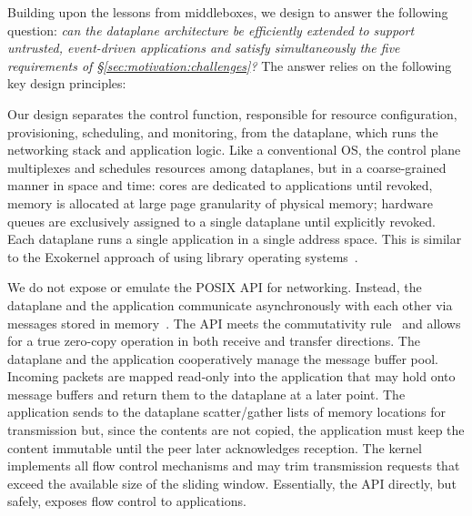 
Building upon the lessons from middleboxes, we design \ix to answer
the following question: {\it {} can the dataplane architecture be
  efficiently extended to support untrusted, event-driven applications
  and satisfy simultaneously the five requirements of
  \S\ref{sec:motivation:challenges}?}  The answer relies on the
following key design principles:


Our design separates the control function, responsible for resource
configuration, provisioning, scheduling, and monitoring, from the
dataplane, which runs the networking stack and application logic.
Like a conventional OS, the control plane multiplexes and schedules
resources among dataplanes, but in a coarse-grained manner in space and
time: cores are dedicated to applications until revoked, memory is
allocated at large page granularity of physical memory; hardware queues are
exclusively assigned to a single dataplane until explicitly revoked.
Each dataplane runs a single application in a single address space.
This is similar to the Exokernel approach of using library operating
systems~\cite{DBLP:conf/sosp/EnglerKO95}.

 We do
not expose or emulate the POSIX API for networking.  Instead, the
dataplane and the application communicate asynchronously with each
other via messages stored in
memory~\cite{rizzo2012netmap,han2012megapipe}.  The API meets the
commutativity rule~\cite{DBLP:conf/sosp/ClementsKZMK13} and allows for
a true zero-copy operation in both receive and transfer
directions. The dataplane and the application cooperatively manage the
message buffer pool. Incoming packets are mapped read-only into the
application that may hold onto message buffers and return them to the
dataplane at a later point.  The application sends to the dataplane
scatter/gather lists of memory locations for transmission but, since
the contents are not copied, the application must keep the content
immutable until the peer later acknowledges reception. The kernel
implements all flow control mechanisms and may trim transmission
requests that exceed the available size of the sliding
window.  Essentially, the API directly, but safely, exposes
flow control to applications.


